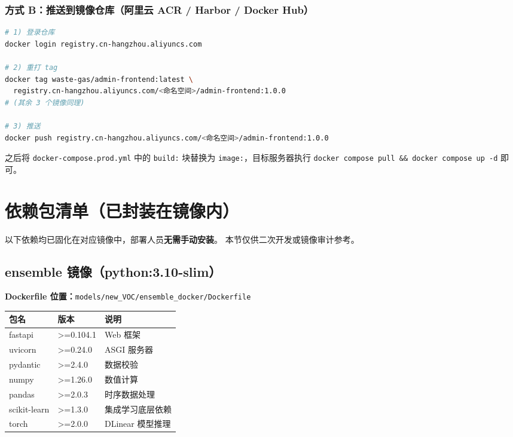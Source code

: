 \documentclass[UTF8,a4paper,11pt]{ctexart}
\begin{document}
\subsubsection{方式 B：推送到镜像仓库（阿里云 ACR / Harbor / Docker Hub）}

\begin{lstlisting}[language=bash]
# 1) 登录仓库
docker login registry.cn-hangzhou.aliyuncs.com

# 2) 重打 tag
docker tag waste-gas/admin-frontend:latest \
  registry.cn-hangzhou.aliyuncs.com/<命名空间>/admin-frontend:1.0.0
# (其余 3 个镜像同理)

# 3) 推送
docker push registry.cn-hangzhou.aliyuncs.com/<命名空间>/admin-frontend:1.0.0
\end{lstlisting}

之后将 \texttt{docker-compose.prod.yml} 中的 \texttt{build:} 块替换为
\texttt{image:}，目标服务器执行 \texttt{docker compose pull \&\& docker compose up -d} 即可。

\section{依赖包清单（已封装在镜像内）}

\begin{infobox}[说明]
以下依赖均已固化在对应镜像中，部署人员\textbf{无需手动安装}。
本节仅供二次开发或镜像审计参考。
\end{infobox}

\subsection{ensemble 镜像（python:3.10-slim）}

\textbf{Dockerfile 位置：}\texttt{models/new\_VOC/ensemble\_docker/Dockerfile}

\begin{longtable}{L{3.5cm} L{2.0cm} L{7.5cm}}
\toprule
\textbf{包名} & \textbf{版本} & \textbf{说明} \\
\midrule
\endhead
fastapi          & >=0.104.1 & Web 框架 \\
uvicorn          & >=0.24.0  & ASGI 服务器 \\
pydantic         & >=2.4.0   & 数据校验 \\
numpy            & >=1.26.0  & 数值计算 \\
pandas           & >=2.0.3   & 时序数据处理 \\
scikit-learn     & >=1.3.0   & 集成学习底层依赖 \\
torch            & >=2.0.0   & DLinear 模型推理 \\
\bottomrule
\end{longtable}
\end{document}
